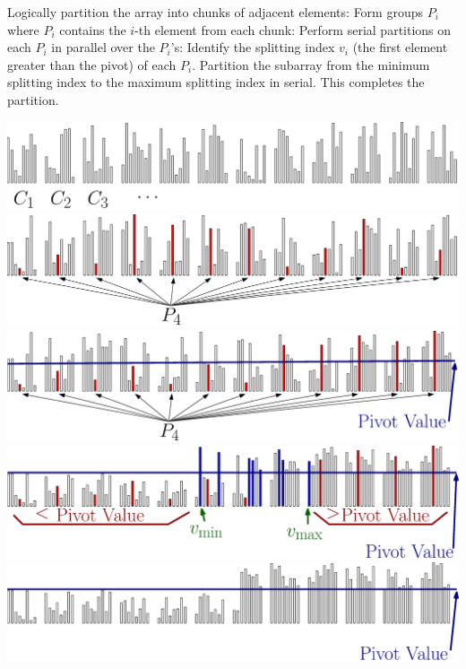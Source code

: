 \documentclass[xcolor=x11names, svgnames, rgb]{beamer}
\begin{document}
\begin{frame}[t]{}%
	\vspace{0.25cm}
	\begin{overprint}
	Logically partition the array into chunks of adjacent elements:
	\onslide<2>Form groups $P_i$ where $P_i$ contains the $i$-th element from each chunk:
	\onslide<3>Perform serial partitions on each $P_i$ in parallel over the $P_i$'s:
	\onslide<4>Identify the splitting index $v_i$ (the first element greater than the pivot) of each $P_i$. 
	\onslide<5>Partition the subarray from the minimum splitting index to the maximum splitting index in serial. This completes the partition. 
	\end{overprint}
	\vspace{0.25cm}
	\begin{overprint}
	\includegraphics[width=\linewidth]{imgs/stridedAlgSim1Ann.eps}
	\onslide<2>\includegraphics[width=\linewidth]{imgs/stridedAlgSim2Ann.eps}
	\onslide<3>\includegraphics[width=\linewidth]{imgs/stridedAlgSim3Ann.eps}
	\onslide<4>\includegraphics[width=\linewidth]{imgs/stridedAlgSim4Ann.eps}
	\onslide<5>\includegraphics[width=\linewidth]{imgs/stridedAlgSim5Ann.eps}

\end{overprint}
\end{frame}
\end{document}
